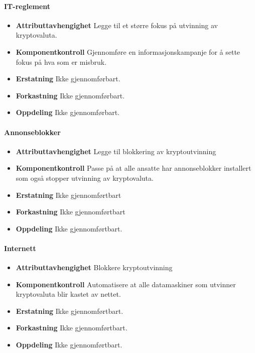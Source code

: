 \paragraph{IT-reglement}
\begin{itemize}
    \item \textbf{Attributtavhengighet} Legge til et større fokus på utvinning av kryptovaluta.
    \item \textbf{Komponentkontroll} Gjennomføre en informasjonskampanje for å sette fokus på hva som er misbruk.
    \item \textbf{Erstatning} Ikke gjennomførbart.
    \item \textbf{Forkastning} Ikke gjennomførbart.
    \item \textbf{Oppdeling} Ikke gjennomførbart. 
\end{itemize}

\paragraph{Annonseblokker}
\begin{itemize}
    \item \textbf{Attributtavhengighet} Legge til blokkering av kryptoutvinning 
    \item \textbf{Komponentkontroll} Passe på at alle ansatte har annonseblokker installert som også stopper utvinning av kryptovaluta.
    \item \textbf{Erstatning} Ikke gjennomførtbart
    \item \textbf{Forkastning} Ikke gjennomførtbart
    \item \textbf{Oppdeling} Ikke gjennomførtbart.
\end{itemize}

\paragraph{Internett}
\begin{itemize}
    \item \textbf{Attributtavhengighet} Blokkere kryptoutvinning
    \item \textbf{Komponentkontroll} Automatisere at alle datamaskiner som utvinner kryptovaluta blir kastet av nettet.
    \item \textbf{Erstatning} Ikke gjennomførtbart.
    \item \textbf{Forkastning} Ikke gjennomførtbart.
    \item \textbf{Oppdeling} Ikke gjennomførtbart.
\end{itemize}


